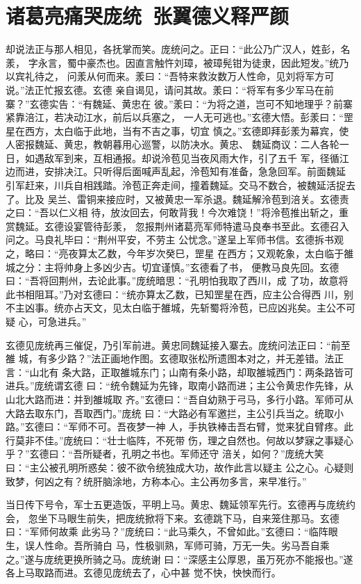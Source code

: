 \chapter{诸葛亮痛哭庞统~张翼德义释严颜}

却说法正与那人相见，各抚掌而笑。庞统问之。正曰：“此公乃广汉人，姓彭，名羕，
字永言，蜀中豪杰也。因直言触忤刘璋，被璋髡钳为徒隶，因此短发。”统乃以宾礼待之，
问羕从何而来。羕曰：“吾特来救汝数万人性命，见刘将军方可说。”法正忙报玄德。玄德
亲自谒见，请问其故。羕曰：“将军有多少军马在前寨？”玄德实告：“有魏延、黄忠在
彼。”羕曰：“为将之道，岂可不知地理乎？前寨紧靠涪江，若决动江水，前后以兵塞之，
一人无可逃也。”玄德大悟。彭羕曰：“罡星在西方，太白临于此地，当有不吉之事，切宜
慎之。”玄德即拜彭羕为幕宾，使人密报魏延、黄忠，教朝暮用心巡警，以防决水。黄忠、
魏延商议：二人各轮一日，如遇敌军到来，互相通报。却说泠苞见当夜风雨大作，引了五千
军，径循江边而进，安排决江。只听得后面喊声乱起，泠苞知有准备，急急回军。前面魏延
引军赶来，川兵自相践踏。泠苞正奔走间，撞着魏延。交马不数合，被魏延活捉去了。比及
吴兰、雷铜来接应时，又被黄忠一军杀退。魏延解泠苞到涪关。玄德责之曰：“吾以仁义相
待，放汝回去，何敢背我！今次难饶！”将泠苞推出斩之，重赏魏延。玄德设宴管待彭羕，
忽报荆州诸葛亮军师特遣马良奉书至此。玄德召入问之。马良礼毕曰：“荆州平安，不劳主
公忧念。”遂呈上军师书信。玄德拆书观之，略曰：“亮夜算太乙数，今年岁次癸巳，罡星
在西方；又观乾象，太白临于雒城之分：主将帅身上多凶少吉。切宜谨慎。”玄德看了书，
便教马良先回。玄德曰：“吾将回荆州，去论此事。”庞统暗思：“孔明怕我取了西川，成
了功，故意将此书相阻耳。”乃对玄德曰：“统亦算太乙数，已知罡星在西，应主公合得西
川，别不主凶事。统亦占天文，见太白临于雒城，先斩蜀将泠苞，已应凶兆矣。主公不可疑
心，可急进兵。”

玄德见庞统再三催促，乃引军前进。黄忠同魏延接入寨去。庞统问法正曰：“前至雒
城，有多少路？”法正画地作图。玄德取张松所遗图本对之，并无差错。法正言：“山北有
条大路，正取雒城东门；山南有条小路，却取雒城西门：两条路皆可进兵。”庞统谓玄德
曰：“统令魏延为先锋，取南小路而进；主公令黄忠作先锋，从山北大路而进：并到雒城取
齐。”玄德曰：“吾自幼熟于弓马，多行小路。军师可从大路去取东门，吾取西门。”庞统
曰：“大路必有军邀拦，主公引兵当之。统取小路。”玄德曰：“军师不可。吾夜梦一神
人，手执铁棒击吾右臂，觉来犹自臂疼。此行莫非不佳。”庞统曰：“壮士临阵，不死带
伤，理之自然也。何故以梦寐之事疑心乎？”玄德曰：“吾所疑者，孔明之书也。军师还守
涪关，如何？”庞统大笑曰：“主公被孔明所惑矣：彼不欲令统独成大功，故作此言以疑主
公之心。心疑则致梦，何凶之有？统肝脑涂地，方称本心。主公再勿多言，来早准行。”

当日传下号令，军士五更造饭，平明上马。黄忠、魏延领军先行。玄德再与庞统约会，
忽坐下马眼生前失，把庞统掀将下来。玄德跳下马，自来笼住那马。玄德曰：“军师何故乘
此劣马？”庞统曰：“此马乘久，不曾如此。”玄德曰：“临阵眼生，误人性命。吾所骑白
马，性极驯熟，军师可骑，万无一失。劣马吾自乘之。”遂与庞统更换所骑之马。庞统谢
曰：“深感主公厚恩，虽万死亦不能报也。”遂各上马取路而进。玄德见庞统去了，心中甚
觉不快，怏怏而行。

